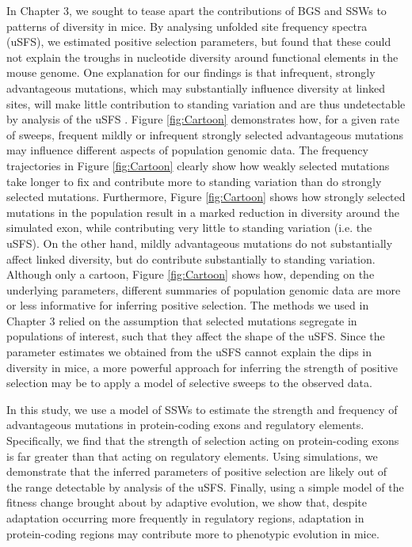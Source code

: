 	In Chapter 3, we sought to tease apart the contributions of BGS and SSWs to patterns of diversity in mice. By analysing unfolded site frequency spectra (uSFS), we estimated positive selection parameters, but found that these could not explain the troughs in nucleotide diversity around functional elements in the mouse genome. One explanation for our findings is that infrequent, strongly advantageous mutations, which may substantially influence diversity at linked sites, will make little contribution to standing variation and are thus undetectable by analysis of the uSFS \citep{RN290}. Figure \ref{fig:Cartoon} demonstrates how, for a given rate of sweeps, frequent mildly or infrequent strongly selected advantageous mutations may influence different aspects of population genomic data. The frequency trajectories in Figure \ref{fig:Cartoon} clearly show how weakly selected mutations take longer to fix and contribute more to standing variation than do strongly selected mutations. Furthermore, Figure \ref{fig:Cartoon} shows how strongly selected mutations in the population result in a marked reduction in diversity around the simulated exon, while contributing very little to standing variation (i.e. the uSFS). On the other hand, mildly advantageous mutations do not substantially affect linked diversity, but do contribute substantially to standing variation. Although only a cartoon, Figure \ref{fig:Cartoon} shows how, depending on the underlying parameters, different summaries of population genomic data are more or less informative for inferring positive selection. The methods we used in Chapter 3 relied on the assumption that selected mutations segregate in populations of interest, such that they affect the shape of the uSFS. Since the parameter estimates we obtained from the uSFS cannot explain the dips in diversity in mice, a more powerful approach for inferring the strength of positive selection may be to apply a model of selective sweeps to the observed data.
	
	In this study, we use a model of SSWs to estimate the strength and frequency of advantageous mutations in protein-coding exons and regulatory elements. Specifically, we find that the strength of selection acting on protein-coding exons is far greater than that acting on regulatory elements. Using simulations, we demonstrate that the inferred parameters of positive selection are likely out of the range detectable by analysis of the uSFS.  Finally, using a simple model of the fitness change brought about by adaptive evolution, we show that, despite adaptation occurring more frequently in regulatory regions, adaptation in protein-coding regions may contribute more to phenotypic evolution in mice.



